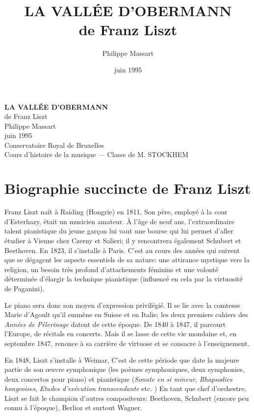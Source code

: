 \documentclass[11pt,a4paper]{scrartcl}
\title{LA VALLÉE D'OBERMANN\\ de Franz Liszt}
\author{Philippe Massart}
\begin{document}
\titlepage
\date {juin 1995}
\begin{center}
{\large \textbf{LA VALLÉE D'OBERMANN}} \\de Franz Liszt \vspace{2cm}
\\Philippe Massart\vspace{16cm}
\\juin 1995
\\Conservatoire Royal de Bruxelles
\\Cours d'histoire de la musique --- Classe de M. STOCKHEM
\end{center}
\newpage
\newpage
\section{Biographie succincte de Franz Liszt}

Franz Liszt naît à Raiding (Hongrie) en 1811, Son père, employé à la cour d'Esterhazy, était un musicien amateur.
À l'âge de neuf ans, l'extraordinaire talent pianistique du jeune garçon lui vaut une bourse qui lui permet d'aller étudier à Vienne chez Czerny et Salieri;
il y rencontrera également Schubert et Beethoven. En 1823, il s'installe à Paris.
C'est au cours des années qui suivent que se dégagent les aspects essentiels de sa nature:
une attirance mystique vers la religion, un besoin très profond d'attachements féminins et une volonté déterminée
d'élargir la technique pianistique (influencé en cela par la virtuosité de Paganini).

Le piano sera donc son moyen d'expression privilégié. Il se lie avec la comtesse Marie d'Agoult qu'il emmène en
Suisse et en Italie; les deux premiers cahiers des \emph{Années de Pèlerinage} datent de cette époque.
De 1840 à 1847, il parcourt l'Europe, de récitals en concerts. Mais il se lasse de cette vie mondaine et,
en septembre 1847, renonce à sa carrière de virtuose et se consacre à l'enseignement.

En 1848, Liszt s'installe à Weimar, C'est de cette période que date la majeure partie de son \oe{}uvre symphonique
(les poèmes symphoniques, deux symphonies, deux concertos pour piano)
et pianistique (\emph{Sonate en si mineur}, \emph{Rhapsodies hongroises}, \emph{Etudes d'exécution transcendante} etc. )
En tant que chef d'orchestre, Liszt se fait le champion d'autres compositeurs: Beethoven, Schubert
(encore peu connu à l'époque), Berlioz et surtout Wagner.
\end{document}
